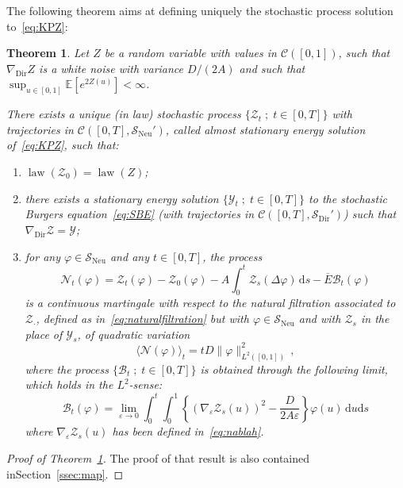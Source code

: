 \documentclass[10pt]{amsart}
\newtheorem{theo}{Theorem}[section]
\theoremstyle{definition}\newtheorem{defi}[theo]{Definition}\newtheorem{rema}[theo]{Remark}\newtheorem{exam}[theo]{Example}\newtheorem{exem}[theo]{Example}\newtheorem{nota}[theo]{Notation}
\DeclareMathOperator{\Dir}{Dir}
\DeclareMathOperator{\Neu}{Neu}
\DeclareMathOperator{\law}{law}
\newcommand{\bb}[1]{{\mathbb #1}}
\newcommand{\mc}[1]{{\mathcal #1}}
\renewcommand{\mc}[1]{{\mathcal #1}}
\newcommand{\SD}{\ensuremath{\mc S_{\Dir}}}
\newcommand{\SN}{\ensuremath{\mc S_{\Neu}}}
\renewcommand{\bar}{\overline}
\newcommand*{\dd}{\mathrm{d}}
\newcommand*{\ds}{\dd s}
\newcommand*{\du}{\dd u}
\begin{document}
The following theorem aims at defining uniquely the stochastic process solution to~\eqref{eq:KPZ}:

\begin{theo}\label{def:energy-KPZ}
Let $Z$ be a random variable with values in $\mc C([0,1])$, such that $\nabla_{\Dir} Z$ is a white noise with variance $D/(2A)$ and such that $\sup_{u \in [0,1]} \bb E[e^{2Z(u)}] < \infty$.

There exists a unique (in law) stochastic process $\{ \mc Z_t \; ; \; t \in [0,T]\}$ with trajectories in $\mc C([0,T],\SN')$, called \emph{almost stationary energy solution} of~\eqref{eq:KPZ}, such that:
\begin{enumerate}
\item \label{3.7.1} $\law(\mc Z_0) = \law (Z)$;

\item \label{3.7.2} there exists a stationary energy solution $\{\mc Y_t \; ; \; t \in [0,T]\}$ to the stochastic Burgers equation~\eqref{eq:SBE} (with trajectories in $\mc C([0,T],\SD')$) such that\linebreak $\nabla_{\Dir}\mc Z = \mc Y$;

\item \label{3.7.3} for any $\varphi \in \SN$ and any $t\in[0,T]$, the process
\[
\mc N_t(\varphi) = \mc Z_t(\varphi)- \mc Z_0(\varphi) - A\int_0^t \mc Z_s(\Delta \varphi)\,\ds - \bar{E} \mc B_t(\varphi)
\]
is a continuous martingale with respect to the natural filtration associated to $\mc Z_\cdot$, defined as in~\eqref{eq:naturalfiltration} but with $\varphi\in \SN$ and with $\mc Z_s$ in the place of $\mc Y_s$, of quadratic variation
\[
\big\langle \mc N(\varphi) \big\rangle_t = t D \big\| \varphi \big\|^2_{L^2([0,1])}\,,
\]
where the process $\{\mc B_t\; ; \; t\in[0,T]\}$ is obtained through the following limit, which holds in the $ L^2$-sense:
\begin{equation}\label{eq:B-def}
\mathcal{B}_t (\varphi) = \lim_{\varepsilon \to 0} \int_0^t \int_0^1 \left\{ (\nabla_{\varepsilon} \mc Z_s (u))^2 - \frac{D}{2A\varepsilon} \right\} \varphi (u) \,\du \ds
\end{equation}
where $ \nabla_{\varepsilon} \mc Z_s (u)$ has been defined in~\eqref{eq:nablah}.
\end{enumerate}
\end{theo}

\begin{proof}[Proof of Theorem~\ref{def:energy-KPZ}]
The proof of that result is also contained in\linebreak Section~\ref{ssec:map}.
\end{proof}
\end{document}
